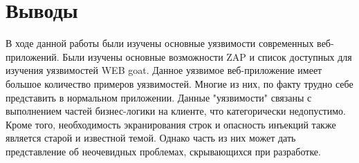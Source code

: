 \documentclass[10pt,a4paper]{article}
\begin{document}
\section{Выводы}

В ходе данной работы были изучены основные уязвимости современных веб-приложений. Были изучены основные возможности ZAP и список доступных для изучения уязвимостей WEB goat. Данное уязвимое веб-приложение имеет большое количество примеров уязвимостей. Многие из них, по факту трудно себе представить в нормальном приложении. Данные "уязвимости" связаны с выполнением частей бизнес-логики на клиенте, что категорически недопустимо. Кроме того, необходимость экранирования строк и опасность инъекций также является старой и известной темой.  Однако часть из них может дать представление об неочевидных проблемах, скрывающихся при разработке. 
\end{document}
